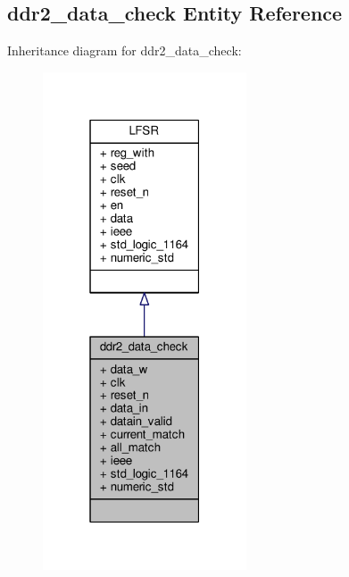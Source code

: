 \subsection{ddr2\+\_\+data\+\_\+check Entity Reference}
\label{classddr2__data__check}


Inheritance diagram for ddr2\+\_\+data\+\_\+check\+:\nopagebreak
\begin{figure}[H]
\begin{center}
\leavevmode
\includegraphics[width=171pt]{da/d50/classddr2__data__check__inherit__graph}
\end{center}
\end{figure}



